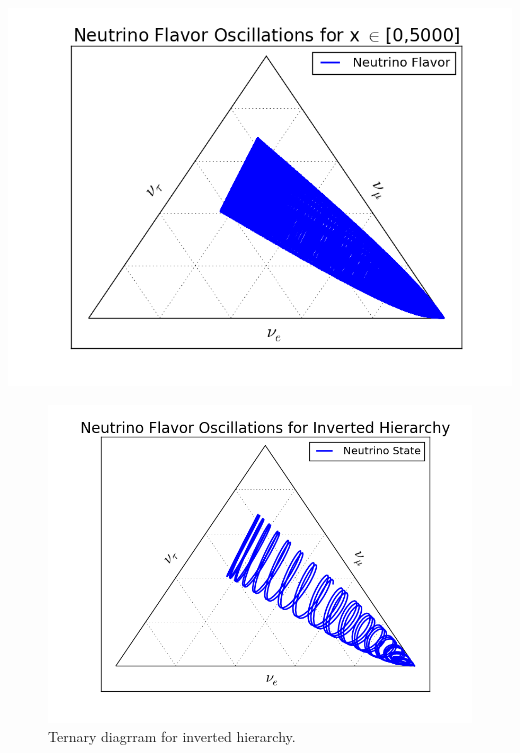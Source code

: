 \documentclass{tufte-handout}
\begin{document}
\begin{marginfigure}
\includegraphics{assets/vacOsc3FlavorTernary5000}
\end{marginfigure}





\begin{figure}
\centering
\includegraphics{assets/ternary/Inv-1000-1.png}
\caption{Ternary diagrram for inverted hierarchy.}
\label{fig:Inv-1000-1}
\end{figure}
\end{document}
